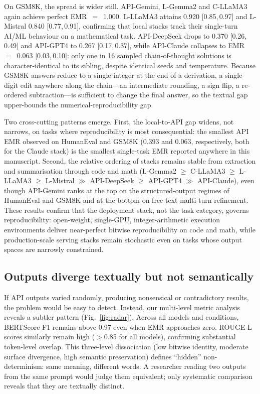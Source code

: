 \documentclass[sn-nature]{sn-jnl}
\begin{document}
On GSM8K, the spread is wider still.
API-Gemini, L-Gemma2 and C-LLaMA3 again achieve perfect EMR~$=$~1.000.
L-LLaMA3 attains 0.920 [0.85,\,0.97] and L-Mistral 0.840 [0.77,\,0.91], confirming that local stacks track their single-turn AI/ML behaviour on a mathematical task.
API-DeepSeek drops to 0.370 [0.26,\,0.49] and API-GPT4 to 0.267 [0.17,\,0.37], while API-Claude collapses to EMR~$=$~0.063 [0.03,\,0.10]: only one in 16 sampled chain-of-thought solutions is character-identical to its sibling, despite identical seeds and temperature.
Because GSM8K answers reduce to a single integer at the end of a derivation, a single-digit edit anywhere along the chain---an intermediate rounding, a sign flip, a re-ordered subtraction---is sufficient to change the final answer, so the textual gap upper-bounds the numerical-reproducibility gap.

Two cross-cutting patterns emerge.
First, the local-to-API gap widens, not narrows, on tasks where reproducibility is most consequential: the smallest API EMR observed on HumanEval and GSM8K (0.393 and 0.063, respectively, both for the Claude stack) is the smallest single-task EMR reported anywhere in this manuscript.
Second, the relative ordering of stacks remains stable from extraction and summarisation through code and math (L-Gemma2 $\geq$ C-LLaMA3 $\geq$ L-LLaMA3 $\geq$ L-Mistral $\gg$ API-DeepSeek $\geq$ API-GPT4 $\gg$ API-Claude), even though API-Gemini ranks at the top on the structured-output regimes of HumanEval and GSM8K and at the bottom on free-text multi-turn refinement.
These results confirm that the deployment stack, not the task category, governs reproducibility: open-weight, single-GPU, integer-arithmetic execution environments deliver near-perfect bitwise reproducibility on code and math, while production-scale serving stacks remain stochastic even on tasks whose output spaces are narrowly constrained.


\subsection{Outputs diverge textually but not semantically}\label{subsec:semantic}

If API outputs varied randomly, producing nonsensical or contradictory results, the problem would be easy to detect.
Instead, our multi-level metric analysis reveals a subtler pattern (Fig.~\ref{fig:radar}).
Across all models and conditions, BERTScore F1 remains above 0.97 even when EMR approaches zero.
ROUGE-L scores similarly remain high ($>$0.85 for all models), confirming substantial token-level overlap.
This three-level dissociation (low bitwise identity, moderate surface divergence, high semantic preservation) defines ``hidden'' non-determinism: same meaning, different words.
A researcher reading two outputs from the same prompt would judge them equivalent; only systematic comparison reveals that they are textually distinct.
\end{document}

